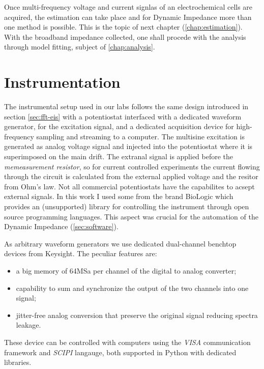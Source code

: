Once multi-frequency voltage and current signlas of an electrochemical cells are acquired, the estimation can take place and for Dynamic Impedance more than one method is possible. This is the topic of next chapter (\ref{chap:estimation}).
With the broadband impedance collected, one shall procede with the analysis through model fitting, subject of \ref{chap:analysis}.

\section{Instrumentation}
\label{sec:instrumentation}

The instrumental setup used in our labs follows the same design introduced in section \ref{sec:fft-eis} with a potentiostat interfaced with a dedicated waveform generator, for the excitation signal, and a dedicated acquisition device for high-frequency sampling and streaming to a computer. 
The multisine excitation is generated as analog voltage signal and injected into the potentiostat where it is superimposed on the main drift.
The extranal signal is applied before the \emph{memeasurement resistor}, so for current controlled experiments the current flowing through the circuit is calculated from the external applied voltage and the resitor from Ohm's law.
Not all commercial potentiostats have the capabilites to acsept external signals.
In this work I used some from the brand BioLogic which provides an (unsupported) library for controlling the instrument through open source programming languages.
This aspect was crucial for the automation of the Dynamic Impedance (\ref{sec:software}).

As arbitrary waveform generators we use dedicated dual-channel benchtop devices from Keysight.
The peculiar features are:
\begin{itemize}
    \item a big memory of 64MSa per channel of the digital to analog converter;
    \item capability to sum and synchronize the output of the two channels into one signal;
    \item jitter-free analog conversion that preserve the original signal reducing spectra leakage.
\end{itemize}
These device can be controlled with computers using the \emph{VISA} communication framework and \emph{SCIPI} langauge, both supported in Python with dedicated libraries.

